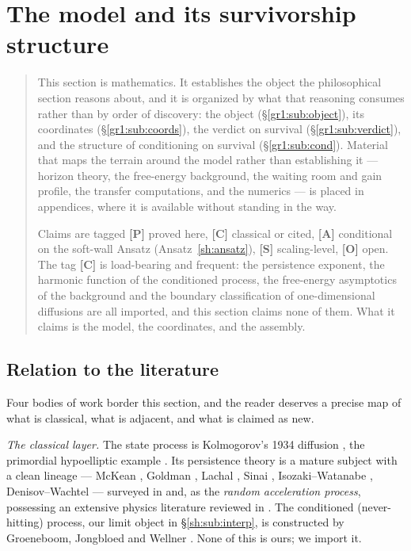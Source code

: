 \documentclass[11pt]{article}
\numberwithin{equation}{section}
\theoremstyle{plain}
\theoremstyle{definition}
\theoremstyle{remark}
\begin{document}
\section{The model and its survivorship structure}\label{gr1:sec}

\begin{quote}\small
This section is mathematics. It establishes the object the philosophical
section reasons about, and it is organized by what that reasoning
consumes rather than by order of discovery: the object
(\S\ref{gr1:sub:object}), its coordinates (\S\ref{gr1:sub:coords}), the
verdict on survival (\S\ref{gr1:sub:verdict}), and the structure of
conditioning on survival (\S\ref{gr1:sub:cond}). Material that maps the
terrain around the model rather than establishing it --- horizon theory,
the free-energy background, the waiting room and gain profile, the
transfer computations, and the numerics --- is placed in appendices,
where it is available without standing in the way.

Claims are tagged \textbf{[P]} proved here, \textbf{[C]} classical or
cited, \textbf{[A]} conditional on the soft-wall Ansatz
(Ansatz~\ref{sh:ansatz}), \textbf{[S]} scaling-level, \textbf{[O]}
open. The tag \textbf{[C]} is load-bearing and frequent: the persistence
exponent, the harmonic function of the conditioned process, the
free-energy asymptotics of the background and the boundary
classification of one-dimensional diffusions are all imported, and this
section claims none of them. What it claims is the model, the
coordinates, and the assembly.
\end{quote}

\subsection*{Relation to the literature}

Four bodies of work border this section, and the reader deserves a
precise map of what is classical, what is adjacent, and what is claimed
as new.

\emph{The classical layer.} The state process is Kolmogorov's 1934
diffusion \cite{Kol34}, the primordial hypoelliptic example
\cite{Hor67}. Its persistence theory is a mature subject with a clean
lineage --- McKean \cite{McK63}, Goldman \cite{Gol71}, Lachal
\cite{Lac91}, Sinai \cite{Sin92}, Isozaki--Watanabe \cite{IW94},
Denisov--Wachtel \cite{DW15} --- surveyed in \cite{AS15} and, as the
\emph{random acceleration process}, possessing an extensive physics
literature reviewed in \cite{BMS13}. The conditioned (never-hitting)
process, our limit object in \S\ref{sh:sub:interp}, is constructed by
Groeneboom, Jongbloed and Wellner \cite{GJW99}. None of this is ours;
we import it.
\end{document}
